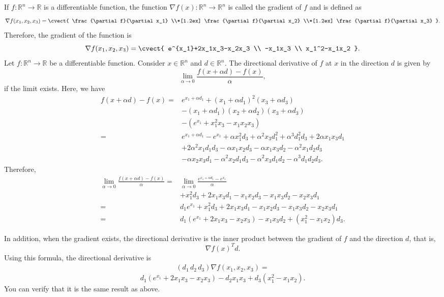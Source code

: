 \newcommand{\MyCorrectSmartChoice}[2][black]{\CorrectChoice \tikzmark{bl}#2\tikzmark{br}\DrawSmartBox[#1]}

If $f: \mathbb{R}^n \rightarrow \mathbb{R}$ is a differentiable
function, the function $\nabla f(x): \mathbb{R}^n \rightarrow \mathbb{R}^n$ is called the gradient of $f$ and is defined as 
\[
  \nabla f(x_1,x_2,x_3)
=
\cvect{
     \frac{\partial f}{\partial x_1} \\*[1.2ex]
    \frac{\partial f}{\partial x_2}  \\*[1.2ex]
    \frac{\partial f}{\partial x_3} 
}.
\]
Therefore, the gradient of the function is
\[
 \nabla f(x_1,x_2,x_3)
=
\cvect{
     e^{x_1}+2x_1x_3-x_2x_3 \\
    -x_1x_3 \\
    x_1^2-x_1x_2
}.
\]
 Let $f: \mathbb{R}^n \rightarrow \mathbb{R}$ be a differentiable
 function. Consider $x \in \mathbb{R}^n$ and $d \in \mathbb{R}^n$. The
 directional derivative of $f$ at $x$ in the direction $d$ is given by
 \[
\lim_{\alpha\to 0} \frac{f(x+ \alpha d)-f(x)}{\alpha}, 
\]
if the limit exists. Here, we have
\begin{align*}
f(x+ \alpha d)-f(x) =& e^{x_1+\alpha d_1} + (x_1+\alpha
d_1)^2(x_3+\alpha d_3) \\ & -(x_1+\alpha d_1)(x_2+\alpha d_2)(x_3+\alpha
d_3) \\&- (e^{x_1} + x_1^2x_3 -x_1x_2x_3) \\
=& e^{x_1+\alpha d_1}- e^{x_1} + \alpha x_1^2 d_3 + \alpha^2 x_3
d_1^2+ \alpha^3 d_1^2 d_3 + 2\alpha x_1 x_3 d_1 \\&+ 2 \alpha^2x_1 d_1
d_3 -\alpha x_1 x_2 d_3 - \alpha x_1 x_3 d_2 - \alpha^2x_1 d_2 d_3 \\&-
\alpha x_2 x_3 d_1 - \alpha^2 x_2 d_1 d_3 -\alpha^2 x_3 d_1 d_2 -
\alpha^3 d_1 d_2 d_3.
\end{align*}
Therefore,
 \begin{align*}
\lim_{\alpha\to 0} \frac{f(x+ \alpha d)-f(x)}{\alpha} =& \lim_{\alpha\to 0}\frac{e^{x_1+\alpha d_1}- e^{x_1}}{\alpha} \\&+  x_1^2 d_3 + 2 x_1 x_3 d_1  - x_1 x_2 d_3 -  x_1 x_3 d_2 -
x_2 x_3 d_1 \\
=&d_1 e^{x_1}+  x_1^2 d_3 + 2 x_1 x_3 d_1  - x_1 x_2 d_3 -  x_1 x_3
d_2 -x_2 x_3 d_1 \\
=&d_1 (e^{x_1}+ 2 x_1 x_3 -x_2 x_3 )-  x_1 x_3
d_2  +  (x_1^2  - x_1 x_2) d_3.
 \end{align*}



In addition, when the gradient exists, the
directional derivative is the inner product between the gradient of
$f$ and the direction $d$, that is,
\[
\nabla f(x)^Td.
\]
Using this formula, the directional derivative is
\begin{align*}
(d_1 \, d_2 \,d_3)\nabla f(x_1,x_2,x_3)=
\end{align*}
\[d_1(e^{x_1}+2x_1x_3-x_2x_3)-d_2x_1x_3+d_3(x_1^2-x_1x_2). \]
You can verify that it is the same result as above.

